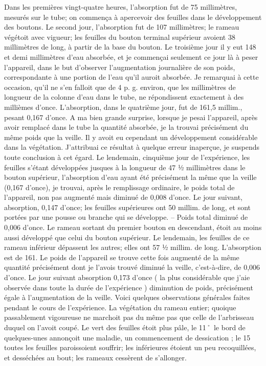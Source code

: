 Dans les premières vingt-quatre heures, l'absorption fut de 75 millimètres, mesurés sur le tube; on commença à apercevoir des feuilles dans le développement des boutons. Le second jour, l'absorption fut de 107 millimètres; le rameau végétoit avec vigueur; les feuilles du bouton terminal supérieur avoient 38 millimètres de long, à partir de la base du bouton. Le troisième jour il y eut 148 et demi millimètres d'eau absorbée, et je commençai seulement ce jour là à peser l'appareil, dans le but d'observer l'augmentation journalière de son poids, correspondante à une portion de l'eau qu'il auroit absorbée. Je remarquai à cette occasion, qu'il ne s'en falloit que de 4 p. g. environ, que les millimètres de longueur de la colonne d'eau dans le tube, ne répondissent exactement à des millièmes d'once.
\setcounter{page}{179} L'absorption, dans le quatrième jour, fut de 161,5 millim., pesant 0,167 d'once. A ma bien grande surprise, lorsque je pesai l'appareil, après avoir remplacé dans le tube la quantité absorbée, je la trouvai précisément du même poids que la veille. Il y avoit eu cependant un développement considérable dans la végétation. J'attribuai ce résultat à quelque erreur inaperçue, je suspends toute conclusion à cet égard.
Le lendemain, cinquième jour de l'expérience, les feuilles s'étant développées jusques à la longueur de 47 ½ millimètres dans le bouton supérieur, l'absorption d'eau ayant été précisément la même que la veille (0,167 d'once), je trouvai, après le remplissage ordinaire, le poids total de l'appareil, non pas augmenté mais diminué de 0,008 d'once.
Le jour suivant, absorption, 0,147 d'once; les feuilles supérieures ont 50 millim. de long, et sont portées par une pousse ou branche qui se développe. -- Poids total diminué de 0,006 d'once. Le rameau sortant du premier bouton en descendant, étoit au moins aussi développé que celui du bouton supérieur.
Le lendemain, les feuilles de ce rameau inférieur dépassent les autres; elles ont 57 ½ millim. de long. L'absorption est de 161. Le\setcounter{page}{180} poids de l'appareil se trouve cette fois augmenté de la même quantité précisément dont je l'avois trouvé diminué la veille, c'est-à-dire, de 0,006 d'once.
Le jour suivant absorption 0,173 d'once ( la plus considérable que j'aie observée dans toute la durée de l'expérience ) diminution de poids, précisément égale à l'augmentation de la veille.
Voici quelques observations générales faites pendant le cours de l'expérience.
La végétation du rameau entier; quoique passablement vigoureuse ne marchoit pas du même pas que celle de l'arbrisseau duquel on l'avoit coupé. Le vert des feuilles étoit plus pâle, le 11˚ le bord de quelques-unes annonçoit une maladie, un commencement de dessication ; le 15 toutes les feuilles paroissoient souffrir; les inférieures étoient un peu recoquillées, et desséchées au bout; les rameaux cessèrent de s'allonger.
